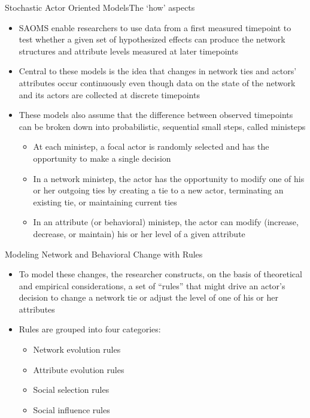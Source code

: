 \documentclass[notes, aspectratio=1610]{beamer}
\begin{document}
\begin{frame}{Stochastic Actor Oriented Models}{The `how' aspects}
\begin{itemize}
	\item SAOMS enable researchers to use data from a first measured 
	timepoint to test whether a given set of hypothesized effects can 
	produce the network structures and attribute levels measured at 
	later timepoints
	\item Central to these models is the idea that changes in network ties 
	and actors' attributes occur continuously even though data on the state 
	of the network and its actors are collected at discrete timepoints
	\item These models also assume that the difference between observed 
	timepoints can be broken down into probabilistic, sequential small 
	steps, called ministeps
	\begin{itemize}
		\item At each ministep, a focal actor is randomly 
	         selected and has the opportunity to make a single decision
		\item In a network ministep, the actor has the opportunity to 
		modify one of his or her outgoing ties by creating a tie to a 
		new actor, terminating an existing tie, or maintaining current ties
		\item In an attribute (or behavioral) ministep, the actor can 
		modify (increase, decrease, or maintain) his or her level of a 
		given attribute
	\end{itemize}
\end{itemize}
\end{frame}

\begin{frame}{Modeling Network and Behavioral Change with Rules}{}
	\begin{itemize}
	\item To model these changes, the researcher constructs, on the basis of 
	theoretical and empirical considerations, a set of ``rules'' that 
	might drive an actor's decision to change a network tie or adjust
	the level of one of his or her attributes
	\item Rules are grouped into four categories:
		\begin{itemize}
		\item Network evolution rules 
		\item Attribute evolution rules 
		\item Social selection rules 
		\item Social influence rules 
		\end{itemize}
	\end{itemize}
\end{frame}
\end{document}
